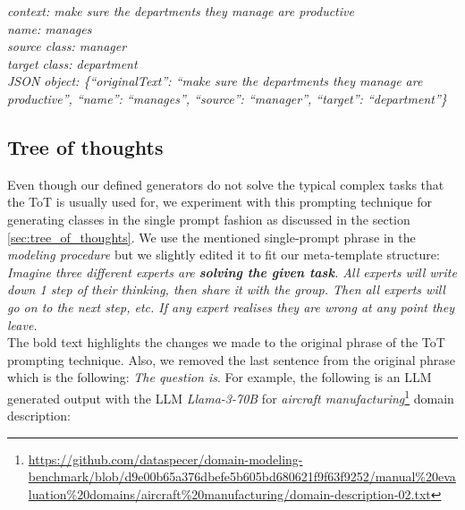 \noindent{}\textit{context: make sure the departments they manage are productive} \\
\textit{name: manages} \\
\textit{source class: manager} \\
\textit{target class: department} \\
\textit{JSON object: \{``originalText'': ``make sure the departments they manage are productive'', ``name'': ``manages'', ``source'': ``manager'', ``target'': ``department''\}}


\subsection{Tree of thoughts}

Even though our defined generators do not solve the typical complex tasks that the ToT is usually used for, we experiment with this prompting technique for generating classes in the single prompt fashion as discussed in the section \ref{sec:tree_of_thoughts}. We use the mentioned single-prompt phrase in the \emph{modeling procedure} but we slightly edited it to fit our meta-template structure: \\

\noindent{}\textit{Imagine three different experts are \textbf{solving the given task}. All experts will write down 1 step of their thinking, then share it with the group. Then all experts will go on to the next step, etc. If any expert realises they are wrong at any point they leave.} \\

\noindent{}The bold text highlights the changes we made to the original phrase of the ToT prompting technique. Also, we removed the last sentence from the original phrase which is the following: \textit{The question is}. For example, the following is an LLM generated output with the LLM \emph{Llama-3-70B} for \textit{aircraft manufacturing}\footnote{\url{https://github.com/dataspecer/domain-modeling-benchmark/blob/d9e00b65a376dbefe5b605bd680621f9f63f9252/manual\%20evaluation\%20domains/aircraft\%20manufacturing/domain-description-02.txt}} domain description: \\

